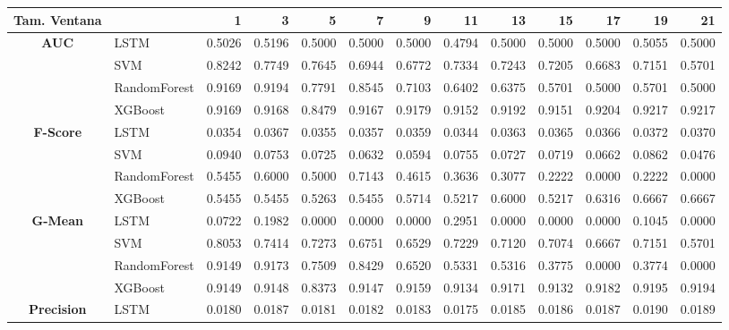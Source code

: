 \begin{table}[H]
	\centering
	\begin{adjustbox}{max width=14cm}
		\begin{tabular}{|c|l|r|r|r|r|r|r|r|r|r|r|r|}
			\hline
			\textbf{Tam. Ventana} &         &      1  &      3  &      5  &      7  &      9  &      11 &      13 &      15 &      17 &      19 &      21 \\
			\hline
			\textbf{AUC} & LSTM &  0.5026 &  0.5196 &  0.5000 &  0.5000 &  0.5000 &  0.4794 &  0.5000 &  0.5000 &  0.5000 &  0.5055 &  0.5000 \\
			& SVM &  0.8242 &  0.7749 &  0.7645 &  0.6944 &  0.6772 &  0.7334 &  0.7243 &  0.7205 &  0.6683 &  0.7151 &  0.5701 \\
			& RandomForest &  0.9169 &  0.9194 &  0.7791 &  0.8545 &  0.7103 &  0.6402 &  0.6375 &  0.5701 &  0.5000 &  0.5701 &  0.5000 \\
			& XGBoost &  0.9169 &  0.9168 &  0.8479 &  0.9167 &  0.9179 &  0.9152 &  0.9192 &  0.9151 &  0.9204 &  0.9217 &  0.9217 \\
			\hline
			\textbf{F-Score} & LSTM &  0.0354 &  0.0367 &  0.0355 &  0.0357 &  0.0359 &  0.0344 &  0.0363 &  0.0365 &  0.0366 &  0.0372 &  0.0370 \\
			& SVM &  0.0940 &  0.0753 &  0.0725 &  0.0632 &  0.0594 &  0.0755 &  0.0727 &  0.0719 &  0.0662 &  0.0862 &  0.0476 \\
			& RandomForest &  0.5455 &  0.6000 &  0.5000 &  0.7143 &  0.4615 &  0.3636 &  0.3077 &  0.2222 &  0.0000 &  0.2222 &  0.0000 \\
			& XGBoost &  0.5455 &  0.5455 &  0.5263 &  0.5455 &  0.5714 &  0.5217 &  0.6000 &  0.5217 &  0.6316 &  0.6667 &  0.6667 \\
			\hline
			\textbf{G-Mean} & LSTM &  0.0722 &  0.1982 &  0.0000 &  0.0000 &  0.0000 &  0.2951 &  0.0000 &  0.0000 &  0.0000 &  0.1045 &  0.0000 \\
			& SVM &  0.8053 &  0.7414 &  0.7273 &  0.6751 &  0.6529 &  0.7229 &  0.7120 &  0.7074 &  0.6667 &  0.7151 &  0.5701 \\
			& RandomForest &  0.9149 &  0.9173 &  0.7509 &  0.8429 &  0.6520 &  0.5331 &  0.5316 &  0.3775 &  0.0000 &  0.3774 &  0.0000 \\
			& XGBoost &  0.9149 &  0.9148 &  0.8373 &  0.9147 &  0.9159 &  0.9134 &  0.9171 &  0.9132 &  0.9182 &  0.9195 &  0.9194 \\
			\hline
			\textbf{Precision} & LSTM &  0.0180 &  0.0187 &  0.0181 &  0.0182 &  0.0183 &  0.0175 &  0.0185 &  0.0186 &  0.0187 &  0.0190 &  0.0189 \\

\end{tabular}
\end{adjustbox}
\end{table}
